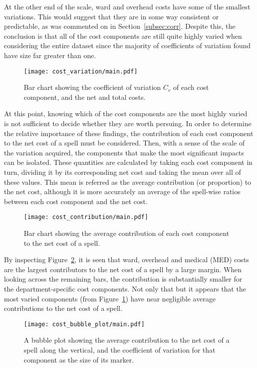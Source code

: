 At the other end of the scale, ward and overhead costs have some of the smallest
variations. This would suggest that they are in some way consistent or
predictable, as was commented on in Section~\ref{subsec:corr}. Despite this, the
conclusion is that all of the cost components are still quite highly varied when
considering the entire dataset since the majority of coefficients of variation
found have size far greater than one. 

\begin{figure}[h]
    \centering
    \texttt{[image: cost\_variation/main.pdf]}
    \caption{Bar chart showing the coefficient of variation \(C_{v}\) of each
        cost component, and the net and total costs.}\label{fig:cost_variation}
\end{figure}

At this point, knowing which of the cost components are the most highly varied
is not sufficient to decide whether they are worth persuing. In order to
determine the relative importance of these findings, the contribution of each
cost component to the net cost of a spell must be considered. Then, with a sense
of the scale of the variation acquired, the components that make the most
significant impacts can be isolated. These quantities are calculated by taking
each cost component in turn, dividing it by its corresponding net cost and
taking the mean over all of these values. This mean is referred as the average
contribution (or proportion) to the net cost, although it is more accurately an
average of the spell-wise ratios between each cost component and the net cost.

\begin{figure}[h]
    \centering
    \texttt{[image: cost\_contribution/main.pdf]}
    \caption{Bar chart showing the average contribution of each cost component
        to the net cost of a spell.}\label{fig:cost_contribution}
\end{figure}

By inspecting Figure~\ref{fig:cost_contribution}, it is seen that ward, overhead
and medical (MED) costs are the largest contributors to the net cost of a spell
by a large margin. When looking across the remaining bars, the contribution is
substantially smaller for the department-specific cost components. Not only that
but it appears that the most varied components (from
Figure~\ref{fig:cost_variation}) have near negligible average contributions to
the net cost of a spell.

\begin{figure}[h]
    \centering
    \texttt{[image: cost\_bubble\_plot/main.pdf]}
    \caption{A bubble plot showing the average contribution to the net cost of a
    spell along the vertical, and the coefficient of variation for that
    component as the size of its marker.}\label{fig:cost_bubble_plot}
\end{figure}

